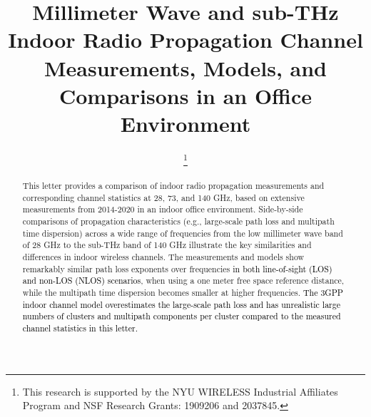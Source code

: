 \documentclass[conference]{IEEEtran}
\begin{document}
\title{Millimeter Wave and sub-THz Indoor Radio Propagation Channel Measurements, Models, and Comparisons in an Office Environment}\vspace{-1.0 cm}
\author{%

\vspace{-1.0 cm}
					\thanks{This research is supported by the NYU WIRELESS Industrial Affiliates Program and NSF Research Grants: 1909206 and 2037845.}
}

\maketitle
\thispagestyle{firststyle}

\begin{abstract} 


This letter provides a comparison of indoor radio propagation measurements and corresponding channel statistics at 28, 73, and 140 GHz, based on extensive measurements from 2014-2020 in an indoor office environment. Side-by-side comparisons of propagation characteristics (e.g., large-scale path loss and multipath time dispersion) across a wide range of frequencies from the low millimeter wave band of 28 GHz to the sub-THz band of 140 GHz illustrate the key similarities and differences in indoor wireless channels. The measurements and models show remarkably similar path loss exponents over frequencies \textcolor{black}{in both line-of-sight (LOS) and non-LOS (NLOS) scenarios}, when using a one meter free space reference distance, while the multipath time dispersion becomes smaller at higher frequencies. \textcolor{black}{The 3GPP indoor channel model overestimates the large-scale path loss and has unrealistic large numbers of clusters and multipath components per cluster compared to the measured channel statistics in this letter.}

\end{abstract}
    
\end{document}
